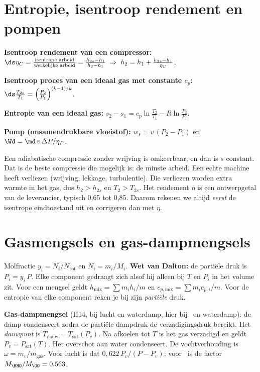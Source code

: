 \section{Entropie, isentroop rendement en pompen}
\begin{methode}[– Cengel H7]
\textbf{Isentroop rendement van een compressor:}
$\ds \eta_C = \frac{\text{isentrope arbeid}}{\text{werkelijke arbeid}} = \frac{h_{2s}-h_1}{h_2-h_1}
\;\Rightarrow\; h_2 = h_1 + \frac{h_{2s}-h_1}{\eta_C}$.

\textbf{Isentroop proces van een ideaal gas met constante $c_p$:}
$\ds \frac{T_{2s}}{T_1} = \left(\frac{P_2}{P_1}\right)^{(k-1)/k}$.

\textbf{Entropie van een ideaal gas:}
$s_2-s_1 = c_p\ln\frac{T_2}{T_1} - R\ln\frac{P_2}{P_1}$.

\textbf{Pomp (onsamendrukbare vloeistof):}
$w_s = v\,(P_2-P_1)$ en $\Wd = \md\,v\,\Delta P/\eta_P$.
\end{methode}
\begin{waarom}
Een adiabatische compressie zonder wrijving is omkeerbaar, en dan is $s$ constant. Dat is de beste compressie die
mogelijk is: de minste arbeid. Een echte machine heeft verliezen (wrijving, lekkage, turbulentie). Die verliezen
worden extra warmte in het gas, dus $h_2 > h_{2s}$ en $T_2 > T_{2s}$. Het rendement $\eta$ is een ontwerpgetal
van de leverancier, typisch 0,65 tot 0,85. Daarom rekenen we altijd \emph{eerst} de isentrope eindtoestand uit en
corrigeren dan met $\eta$.
\end{waarom}

\section{Gasmengsels en gas-dampmengsels}
\begin{methode}[– Cengel H13 en H14]
Molfractie $y_i = N_i/N_\mathrm{tot}$ en $N_i = m_i/M_i$. \textbf{Wet van Dalton:} de partiële druk is
$P_i = y_i\,P$. Elke component gedraagt zich alsof hij alleen bij $T$ en $P_i$ in het volume zit. Voor een
mengsel geldt $h_\mathrm{mix} = \sum m_i h_i/m$ en $c_{p,\mathrm{mix}} = \sum m_i c_{p,i}/m$. Voor de
entropie van elke component reken je bij zijn \emph{partiële} druk.

\textbf{Gas-dampmengsel} (H14, bij lucht en waterdamp, hier bij \OO\ en waterdamp): de damp condenseert zodra
de partiële dampdruk de verzadigingsdruk bereikt. Het \emph{dauwpunt} is $T_\mathrm{dauw} = T_\mathrm{sat}(P_v)$.
Na afkoelen tot $T$ is het gas verzadigd en geldt $P_v = P_\mathrm{sat}(T)$. Het overschot aan water condenseert.
De vochtverhouding is $\omega = m_v/m_\mathrm{gas}$. Voor lucht is dat
$0{,}622\,P_v/(P-P_v)$; voor \OO\ is de factor $M_{\HHO}/M_{\OO} = 0{,}563$.
\end{methode}

